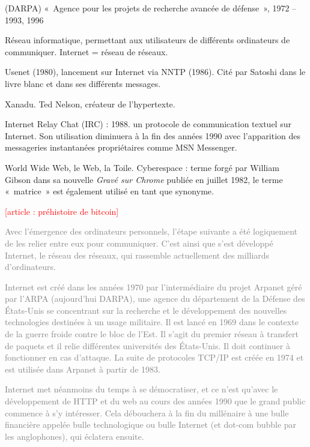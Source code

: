  (DARPA) «~Agence pour les projets de recherche avancée de défense~», 1972 -- 1993, 1996


Réseau informatique, permettant aux utilisateurs de différents ordinateurs de communiquer. Internet = réseau de réseaux.

Usenet (1980), lancement sur Internet via NNTP (1986). Cité par Satoshi dans le livre blanc et dans ses différents messages.

Xanadu. Ted Nelson, créateur de l'hypertexte.

Internet Relay Chat (IRC) : 1988. un protocole de communication textuel sur Internet. Son utilisation diminuera à la fin des années 1990 avec l'apparition des messageries instantanées propriétaires comme MSN Messenger.

World Wide Web, le Web, la Toile. Cyberespace : terme forgé par William Gibson dans sa nouvelle \emph{Gravé sur Chrome} publiée en juillet 1982, le terme «~matrice~» est également utilisé en tant que synonyme.

\textcolor{red}{[article : préhistoire de bitcoin]}

\textcolor{gray}{Avec l'émergence des ordinateurs personnels, l'étape suivante a été logiquement de les relier entre eux pour communiquer. C'est ainsi que s'est développé Internet, le réseau des réseaux, qui rassemble actuellement des milliards d'ordinateurs.}

\textcolor{gray}{Internet est créé dans les années 1970 par l'intermédiaire du projet Arpanet géré par l'ARPA (aujourd'hui DARPA), une agence du département de la Défense des États-Unis se concentrant sur la recherche et le développement des nouvelles technologies destinées à un usage militaire. Il est lancé en 1969 dans le contexte de la guerre froide contre le bloc de l'Est. Il s'agit du premier réseau à transfert de paquets et il relie différentes universités des États-Unis. Il doit continuer à fonctionner en cas d'attaque. La suite de protocoles TCP/IP est créée en 1974 et est utilisée dans Arpanet à partir de 1983.}

\textcolor{gray}{Internet met néanmoins du temps à se démocratiser, et ce n'est qu'avec le développement de HTTP et du web au cours des années 1990 que le grand public commence à s'y intéresser. Cela débouchera à la fin du millénaire à une bulle financière appelée bulle technologique ou bulle Internet (et dot-com bubble par les anglophones), qui éclatera ensuite.}


